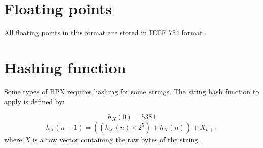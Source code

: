 \section{Floating points}
All floating points in this format are stored in IEEE 754 format \cite{ieee754}.

\section{Hashing function}
Some types of BPX requires hashing for some strings. The string hash function to apply is defined by:

\begin{equation}
	h_X(0) = 5381
\end{equation}
\begin{equation}
	h_X(n + 1) = \left( \left( h_X(n) \times 2^5 \right) + h_X(n) \right) + X_{n + 1}
\end{equation}
where $X$ is a row vector containing the raw bytes of the string.